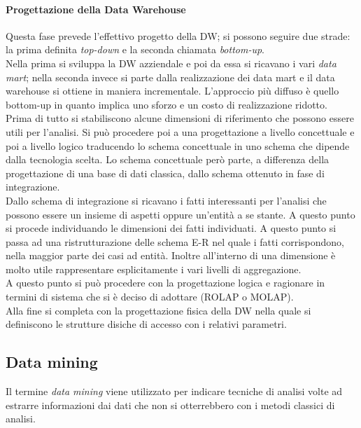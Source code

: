 \paragraph{Progettazione della Data Warehouse} Questa fase prevede l'effettivo progetto della DW; si possono seguire due strade: la prima definita \emph{top-down} e la seconda chiamata \emph{bottom-up}.\\
Nella prima si sviluppa la DW azziendale e poi da essa si ricavano i vari \emph{data mart}; nella seconda invece si parte dalla realizzazione dei data mart e il data warehouse si ottiene in maniera incrementale. L'approccio più diffuso è quello bottom-up in quanto implica uno sforzo e un costo di realizzazione ridotto.\\
Prima di tutto si stabiliscono alcune dimensioni di riferimento che possono essere utili per l'analisi. Si può procedere poi a una progettazione a livello concettuale e poi a livello logico traducendo lo schema concettuale in uno schema che dipende dalla tecnologia scelta. Lo schema concettuale però parte, a differenza della progettazione di una base di dati classica, dallo schema ottenuto in fase di integrazione.\\
Dallo schema di integrazione si ricavano i fatti interessanti per l'analisi che possono essere un insieme di aspetti oppure un'entità a se stante.
A questo punto si procede individuando le dimensioni dei fatti individuati. A questo punto si passa ad una ristrutturazione delle schema E-R nel quale i fatti corrispondono, nella maggior parte dei casi ad entità. Inoltre all'interno di una dimensione è molto utile rappresentare esplicitamente i vari livelli di aggregazione.\\
A questo punto si può procedere con la progettazione logica e ragionare in termini di sistema che si è deciso di adottare (ROLAP o MOLAP).\\
Alla fine si completa con la progettazione fisica della DW nella quale si definiscono le strutture disiche di accesso con i relativi parametri.
\subsection{Data mining}
Il termine \emph{data mining} viene utilizzato per indicare tecniche di analisi volte ad estrarre informazioni dai dati che non si otterrebbero con i metodi classici di analisi.
